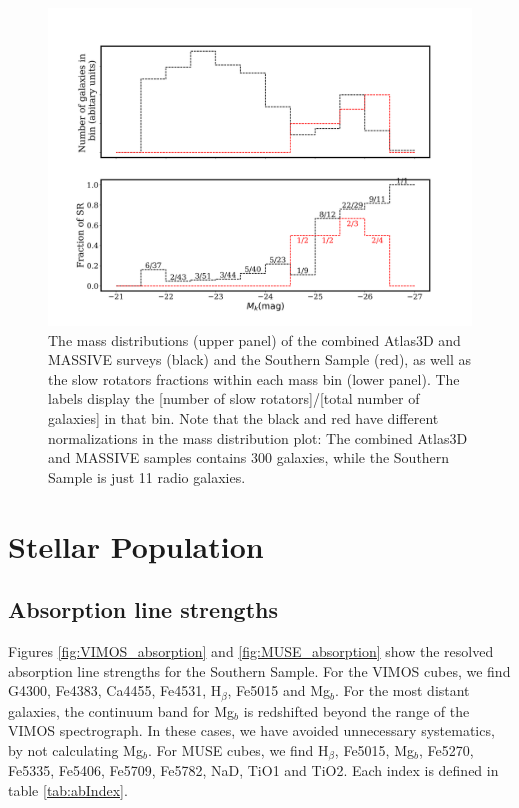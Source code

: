 		

		\begin{figure}
			\centering
			\includegraphics[width=\textwidth]{chapter4/M_k_binned.png}
			\caption[Mass matching global kinematics]{The mass distributions (upper panel) of the combined Atlas3D and MASSIVE surveys (black) and the Southern Sample (red), as well as the slow rotators fractions within each mass bin (lower panel). The labels display the [number of slow rotators]/[total number of galaxies] in that bin. Note that the black and red have different normalizations in the mass distribution plot: The combined Atlas3D and MASSIVE samples contains 300 galaxies, while the Southern Sample is just 11 radio galaxies.}
			\label{fig:SRmassFraction}
		\end{figure}







\section{Stellar Population}
	\label{sec:pop}

	\subsection{Absorption line strengths}
		\label{subsec:absorption}
		Figures \ref{fig:VIMOS_absorption} and \ref{fig:MUSE_absorption} show the resolved absorption line strengths for the Southern Sample. For the VIMOS cubes, we find G4300, Fe4383, Ca4455, Fe4531, H$_\beta$, Fe5015 and Mg$_b$. For the most distant galaxies, the continuum band for Mg$_b$ is redshifted beyond the range of the VIMOS spectrograph. In these cases, we have avoided unnecessary systematics, by not calculating Mg$_b$. For MUSE cubes, we find H$_\beta$, Fe5015, Mg$_b$, Fe5270, Fe5335, Fe5406, Fe5709, Fe5782, NaD, TiO1 and TiO2. Each index is defined in table \ref{tab:abIndex}. 


